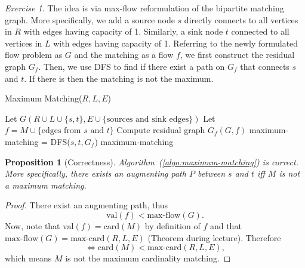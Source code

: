 \documentclass[a4paper,10pt,twoside]{article}
\theoremstyle{plain}
\newtheorem{proposition}{Proposition}
\theoremstyle{definition}
\theoremstyle{remark}
\theoremstyle{exercise}
\newtheorem{exercise}{Exercise}
\begin{document}
\begin{exercise}
The idea is via max-flow reformulation of the bipartite matching graph. 
More specifically, we add a source node $s$ directly connects to all vertices in $R$ with
edges having capacity of 1. Similarly, a  sink node $t$ connected to all vertices
in $L$ with edges having capacity of 1. Referring to the newly formulated flow
problem as $G$ and the matching as a flow $f$, we first construct the residual 
graph $G_f$. Then, we use DFS to find if there exist a path on $G_f$ that connects
$s$ and $t$. If there is then the matching is not the maximum.
\begin{algorithm}
	\caption{Maximum Matching($R, L, E$)}
	\label{algo:maximum-matching}
	Let $G(R\cup L \cup\{s, t\}, E \cup\{\text{sources and sink edges}\})$ \;
	Let $f=M\cup\{\text{edges from $s$ and $t$}\}$ \;
	Compute residual graph $G_f(G, f)$\;
	maximum-matching = DFS($s, t, G_f$) 
	\Return maximum-matching
\end{algorithm}
\begin{proposition}[Correctness]
Algorithm~(\ref{algo:maximum-matching}) is correct. More specifically, there
exists an augmenting path $P$ between $s$ and $t$ iff $M$ is not a maximum matching.
\end{proposition}
\begin{proof}
There exist an augmenting path, thus
\[
	\text{val}(f) < \text{max-flow}(G).
\]
Now, note that $\text{val}(f) = \text{card}(M)$ by definition of $f$ 
and that $\text{max-flow}(G)=\text{max-card}(R, L, E)$ (Theorem
during lecture). Therefore
\[
	\iff\text{card}(M) < \text{max-card}(R, L, E),
\]
which means $M$ is not the maximum cardinality matching.
\end{proof}
\end{exercise}
\end{document}

